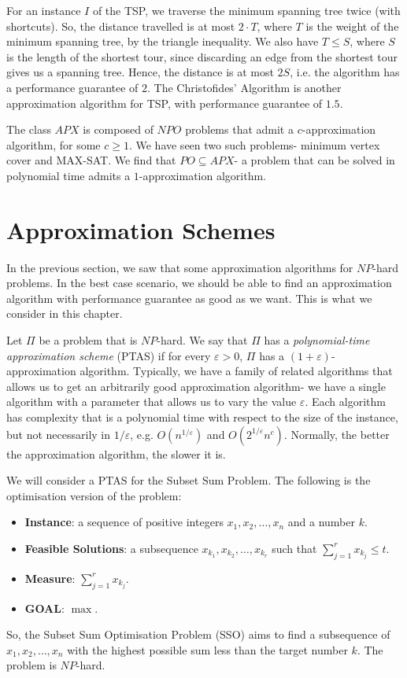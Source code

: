 \documentclass[a4paper, openany]{memoir}
\begin{document}
    For an instance $I$ of the TSP, we traverse the minimum spanning tree twice (with shortcuts). So, the distance travelled is at most $2 \cdot T$, where $T$ is the weight of the minimum spanning tree, by the triangle inequality. We also have $T \leq S$, where $S$ is the length of the shortest tour, since discarding an edge from the shortest tour gives us a spanning tree. Hence, the distance is at most $2S$, i.e. the algorithm has a performance guarantee of $2$. The Christofides' Algorithm is another approximation algorithm for TSP, with performance guarantee of $1.5$.

    The class $APX$ is composed of $NPO$ problems that admit a $c$-approximation algorithm, for some $c \geq 1$. We have seen two such problems- minimum vertex cover and MAX-SAT. We find that $PO \subseteq APX$- a problem that can be solved in polynomial time admits a $1$-approximation algorithm.

    \newpage

    \section{Approximation Schemes}
    In the previous section, we saw that some approximation algorithms for $NP$-hard problems. In the best case scenario, we should be able to find an approximation algorithm with performance guarantee as good as we want. This is what we consider in this chapter.

    Let $\Pi$ be a problem that is $NP$-hard. We say that $\Pi$ has a \emph{polynomial-time approximation scheme} (PTAS) if for every $\varepsilon > 0$, $\Pi$ has a $(1 + \varepsilon)$-approximation algorithm. Typically, we have a family of related algorithms that allows us to get an arbitrarily good approximation algorithm- we have a single algorithm with a parameter that allows us to vary the value $\varepsilon$. Each algorithm has complexity that is a polynomial time with respect to the size of the instance, but not necessarily in $1/\varepsilon$, e.g. $O(n^{1/\varepsilon})$ and $O(2^{1/\varepsilon} n^c)$. Normally, the better the approximation algorithm, the slower it is.

    We will consider a PTAS for the Subset Sum Problem. The following is the optimisation version of the problem:
    \begin{itemize}
        \item \textbf{Instance}: a sequence of positive integers $x_1, x_2, \dots, x_n$ and a number $k$.
        \item \textbf{Feasible Solutions}: a subsequence $x_{k_1}, x_{k_2}, \dots, x_{k_r}$ such that $\sum_{j=1}^r x_{k_j} \leq t$.
        \item \textbf{Measure}: $\sum_{j=1}^r x_{k_j}$.
        \item \textbf{GOAL}: $\max$.
    \end{itemize}
    So, the Subset Sum Optimisation Problem (SSO) aims to find a subsequence of $x_1, x_2, \dots, x_n$ with the highest possible sum less than the target number $k$. The problem is $NP$-hard.
\end{document}
